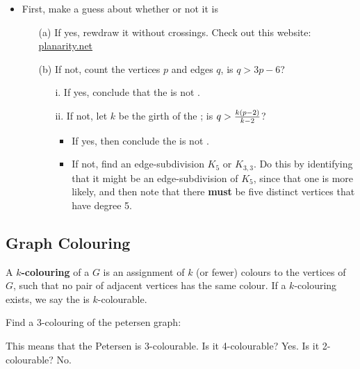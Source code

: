 \documentclass[english, 11pt]{article}
\begin{document}
\begin{itemize}
  \item First, make a guess about whether or not it is 
  \begin{itemize}
    \item[(a)] If yes, rewdraw it without crossings. Check out this website: \url{planarity.net}
    \item[(b)] If not, count the vertices $p$ and edges $q$, is $q > 3p - 6$?
    \begin{itemize}
      \item[i.] If yes, conclude that the  is not .
      \item[ii.] If not, let $k$ be the girth of the ; is $q > \frac{k(p-2)}{k-2}$?
      \begin{itemize}
        \item If yes, then conclude the  is not .
        \item If not, find an edge-subdivision $K_5$ or $K_{3,3}$. Do this by identifying that it might be an edge-subdivision of $K_{5}$, since that one is more likely, and then note that there \textbf{must} be five distinct vertices that have degree 5.
      \end{itemize}
    \end{itemize}
  \end{itemize}
\end{itemize}

\subsection{Graph Colouring}

\begin{defn}[$k$-colouring]\label{k-colouring}
A \textbf{$k$-colouring} of a  $G$ is an assignment of $k$ (or fewer) colours to the vertices of $G$, such that no pair of adjacent vertices has the same colour. If a $k$-colouring exists, we say the  is $k$-colourable.
\end{defn}

\begin{exmp}
Find a 3-colouring of the petersen graph:
   \begin{center}
  \end{center}
  This means that the Petersen  is 3-colourable. Is it 4-colourable? Yes. Is it 2-colourable? No.
\end{exmp}
\end{document}
